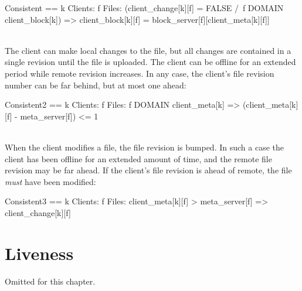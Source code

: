 \begin{tla}
Consistent == 
    \A k \in Clients:
        \A f \in Files:
            (client_change[k][f] = FALSE /\ f \in DOMAIN client_block[k])
                => client_block[k][f] = block_server[f][client_meta[k][f]]
\end{tla}
\begin{tlatex}
%
%
%
\end{tlatex}
\\

The client can make local changes to the file, but all changes are contained in a
single revision until the file is uploaded. The client can be offline for an
extended period while remote revision increases. In any case, the client's
file revision number can be far behind, but at most one ahead:\\

\begin{tla}
Consistent2 == 
    \A k \in Clients:
        \A f \in Files:
            f \in DOMAIN client_meta[k] 
                => (client_meta[k][f] - meta_server[f]) <= 1
\end{tla}
\begin{tlatex}
%
%
%
%
\end{tlatex}
\\

When the client modifies a file, the file revision is bumped. In such a case the 
client has been offline for an extended amount of time, and the remote file revision 
may be far ahead. If the client's file revision is ahead of remote, the file 
\textit{must} have been modified:\\

\begin{tla}
Consistent3 == 
    \A k \in Clients:
        \A f \in Files:
            client_meta[k][f] > meta_server[f] => client_change[k][f]
\end{tla}
\begin{tlatex}
%
%
%
\end{tlatex}

\section{Liveness}

Omitted for this chapter.

% 
